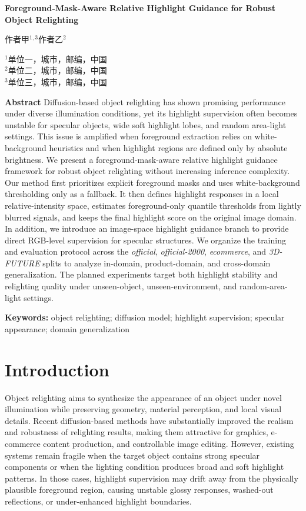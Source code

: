 \documentclass[UTF8,a4paper]{ctexart}
\newcommand{\papertitle}{Foreground-Mask-Aware Relative Highlight Guidance for Robust Object Relighting}
\newcommand{\paperauthora}{作者甲$^{1,3}$}
\newcommand{\paperauthorb}{作者乙$^{2}$}
\newcommand{\affiliation}{
  $^{1}$单位一，城市，邮编，中国\\
  $^{2}$单位二，城市，邮编，中国\\
  $^{3}$单位三，城市，邮编，中国
}
\begin{document}
\begin{center}
{\bfseries{} \papertitle \par}
\vspace{1em}
{ \paperauthora \qquad \paperauthorb \par}
\vspace{0.75em}
{ \affiliation \par}
\end{center}

\vspace{1em}

\noindent\textbf{Abstract}\quad
Diffusion-based object relighting has shown promising performance under diverse illumination conditions, yet its highlight supervision often becomes unstable for specular objects, wide soft highlight lobes, and random area-light settings. This issue is amplified when foreground extraction relies on white-background heuristics and when highlight regions are defined only by absolute brightness. We present a foreground-mask-aware relative highlight guidance framework for robust object relighting without increasing inference complexity. Our method first prioritizes explicit foreground masks and uses white-background thresholding only as a fallback. It then defines highlight responses in a local relative-intensity space, estimates foreground-only quantile thresholds from lightly blurred signals, and keeps the final highlight score on the original image domain. In addition, we introduce an image-space highlight guidance branch to provide direct RGB-level supervision for specular structures. We organize the training and evaluation protocol across the \textit{official}, \textit{official-2000}, \textit{ecommerce}, and \textit{3D-FUTURE} splits to analyze in-domain, product-domain, and cross-domain generalization. The planned experiments target both highlight stability and relighting quality under unseen-object, unseen-environment, and random-area-light settings.

\vspace{0.5em}

\noindent\textbf{Keywords:}\quad
object relighting; diffusion model; highlight supervision; specular appearance; domain generalization

\section{Introduction}

Object relighting aims to synthesize the appearance of an object under novel illumination while preserving geometry, material perception, and local visual details. Recent diffusion-based methods have substantially improved the realism and robustness of relighting results, making them attractive for graphics, e-commerce content production, and controllable image editing. However, existing systems remain fragile when the target object contains strong specular components or when the lighting condition produces broad and soft highlight patterns. In those cases, highlight supervision may drift away from the physically plausible foreground region, causing unstable glossy responses, washed-out reflections, or under-enhanced highlight boundaries.
\end{document}
